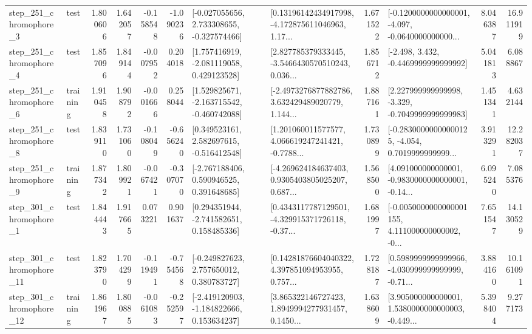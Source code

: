 \begin{tabular}{llrrrrllrlrr}
   step\_251\_chromophore\_3 &      test &      1.800606 &    1.642057 &     -0.158548 & -1.090236 &   [-0.027055656, 2.733308655, -0.327574466] &  [0.13196142434917998, -4.172875611046963, 1.17... &       1.671522 &  [-0.1200000000000001, -4.097, -0.0640000000000... &            8.046387 &         16.911919 \\
   step\_251\_chromophore\_4 &      test &      1.857096 &    1.849144 &     -0.007952 &  0.204018 &    [1.757416919, -2.081119058, 0.429123528] &  [2.827785379333445, -3.5466430570510243, 0.036... &       1.856712 &               [-2.498, 3.432, -0.4469999999999992] &            5.041813 &          6.088867 \\
   step\_251\_chromophore\_6 &  training &      1.910458 &    1.908792 &     -0.001666 &  0.258044 &   [1.529825671, -2.163715542, -0.460742088] &  [-2.4973276877882786, 3.632429489020779, 1.144... &       1.887161 &   [2.227999999999998, -3.329, -0.7049999999999983] &            1.451341 &          4.632144 \\
   step\_251\_chromophore\_8 &      test &      1.839110 &    1.731060 &     -0.108049 & -0.656240 &    [0.349523161, 2.582697615, -0.516412548] &  [1.201060011577577, 4.066619247241421, -0.7788... &       1.730899 &  [-0.28300000000000125, -4.054, 0.7019999999999... &            3.913291 &         12.282037 \\
   step\_251\_chromophore\_9 &  training &      1.877342 &    1.809921 &     -0.067421 & -0.307070 &    [-2.767188406, 0.590946525, 0.391648685] &  [-4.269624184637403, 0.9305403805025207, 0.687... &       1.568500 &  [4.091000000000001, -0.9830000000000001, -0.14... &            6.095240 &          7.085376 \\
   step\_301\_chromophore\_1 &      test &      1.844443 &    1.917665 &      0.073221 &  0.901637 &    [0.294351944, -2.741582651, 0.158485336] &  [0.4343117787129501, -4.329915371726118, -0.37... &       1.681997 &  [-0.0050000000000001155, 4.111000000000002, -0... &            7.651547 &         14.130529 \\
  step\_301\_chromophore\_11 &      test &      1.823790 &    1.704299 &     -0.119491 & -0.754568 &    [-0.249827623, 2.757650012, 0.380783727] &  [0.14281876604040322, 4.397851094953955, 0.757... &       1.728187 &  [0.5989999999999966, -4.030999999999999, -0.71... &            3.884160 &         10.161091 \\
  step\_301\_chromophore\_12 &  training &      1.861967 &    1.800885 &     -0.061083 & -0.252597 &   [-2.419120903, -1.184822666, 0.153634237] &  [3.865322146727423, 1.8949994277931457, 0.1450... &       1.638609 &  [3.905000000000001, 1.5380000000000003, -0.449... &            5.398404 &          9.277173 \\

\end{tabular}
